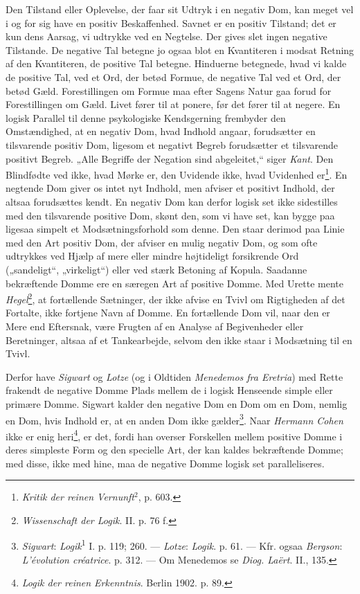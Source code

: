\documentclass[12pt,a4paper]{book}
\newcommand{\apage}[1]{\marginnote{\footnotesize\textit{[#1]}}}
\begin{document}
Den Tilstand eller Oplevelse, der faar sit Udtryk i en negativ Dom, kan
meget vel i og for sig have en positiv Beskaffenhed. Savnet er en
positiv Tilstand; det er kun dens Aarsag, vi udtrykke ved en Negtelse.
Der gives slet ingen negative Tilstande. De negative Tal betegne jo
ogsaa blot en Kvantiteren i modsat Retning af den Kvantiteren, de
positive Tal betegne. Hinduerne betegnede, hvad vi kalde de positive
Tal, ved et Ord, der betød Formue, de negative Tal ved et Ord, der betød
Gæld. Forestillingen om Formue maa efter Sagens Natur gaa forud for
Forestillingen om Gæld. Livet fører til at ponere, før det fører til at
negere. En logisk Parallel til denne psykologiske Kendsgerning frembyder
den Omstændighed, at en negativ Dom, hvad Indhold angaar, forudsætter en
tilsvarende positiv Dom, ligesom et negativt Begreb forudsætter et
tilsvarende positivt Begreb. „Alle Begriffe der Negation sind
abgeleitet,“ siger \emph{Kant}. Den Blindfødte ved ikke, hvad Mørke er,
den Uvidende ikke, hvad Uvidenhed er\footnote{\emph{Kritik der reinen
Vernunft}$^2$, p. 603.}. En negtende Dom giver os intet nyt Indhold, men
afviser et positivt Indhold, der altsaa forudsættes kendt. En negativ
Dom kan derfor logisk set ikke sidestilles med den tilsvarende positive
Dom, skønt den, som vi have set, kan bygge paa ligesaa simpelt et
Modsætningsforhold som denne. Den staar derimod paa Linie med den Art
positiv Dom, der afviser en mulig negativ Dom, og som ofte udtrykkes ved
Hjælp af mere eller mindre højtideligt forsikrende Ord („sandeligt“,
„virkeligt“) eller ved stærk Betoning af Kopula. Saadanne bekræftende
Domme ere en særegen Art af positive Domme. Med Urette mente
\emph{Hegel}\footnote{\emph{Wissenschaft der Logik}. II. p. 76 f.}, at
fortællende \apage{78} Sætninger, der ikke afvise en Tvivl om Rigtigheden af det
Fortalte, ikke fortjene Navn af Domme. En fortællende Dom vil, naar den
er Mere end Eftersnak, være Frugten af en Analyse af Begivenheder eller
Beretninger, altsaa af et Tankearbejde, selvom den ikke staar i
Modsætning til en Tvivl.

Derfor have \emph{Sigwart} og \emph{Lotze} (og i Oldtiden
\emph{Menedemos fra Eretria}) med Rette frakendt de negative Domme
Plads mellem de i logisk Henseende simple eller primære Domme. Sigwart
kalder den negative Dom en Dom om en Dom, nemlig en Dom, hvis Indhold
er, at en anden Dom ikke gælder\footnote{\emph{Sigwart}:
\emph{Logik}\textsuperscript{1} I. p. 119; 260. --- \emph{Lotze}:
\emph{Logik}. p. 61. --- Kfr. ogsaa \emph{Bergson}: \emph{L'évolution
créatrice}. p. 312. --- Om Menedemos se \emph{Diog. Laërt}. II., 135.}.
Naar \emph{Hermann Cohen} ikke er enig heri\footnote{\emph{Logik der
reinen Erkenntnis}. Berlin 1902. p. 89.}, er det, fordi han overser
Forskellen mellem positive Domme i deres simpleste Form og den specielle
Art, der kan kaldes bekræftende Domme; med disse, ikke med hine, maa de
negative Domme logisk set paralleliseres.
\end{document}
